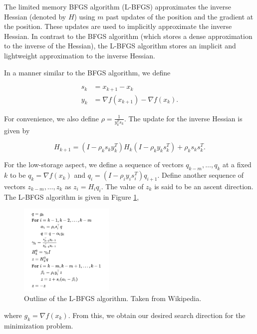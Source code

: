 
The limited memory BFGS algorithm (L-BFGS) approximates the inverse Hessian (denoted by $H$) using $m$ past updates of 
the position and the gradient at the position. These updates are used to implicitly approximate the inverse Hessian. In 
contrast to the BFGS algorithm (which stores a dense approximation to the inverse of the Hessian), the L-BFGS algorithm 
stores an implicit and lightweight approximation to the inverse Hessian.


In a manner similar to the BFGS algorithm, we define

\begin{align*}
    s_k &= x_{k+1} - x_k\\
    y_k &= \nabla f(x_{k+1}) - \nabla f(x_k).
\end{align*}

\noindent For convenience, we also define $\rho = \frac{1}{y_k^Ts_k}$. The update for the inverse Hessian is given by

$$
    H_{k+1} = (I - \rho_ks_ky_k^T)H_k(I - \rho_ky_ks_k^T) + \rho_ks_ks_k^T.
$$

For the low-storage aspect, we define a sequence of vectors $q_{k-m}, \dots, q_k$ at a fixed $k$ to be 
$q_k = \nabla f(x_k)$ and $q_i = (I - \rho_iy_is_i^T)q_{i+1}$. Define another sequence of vectors $z_{k-m},\dots, z_k$ 
as $z_i = H_iq_i$. The value of $z_k$ is said to be an ascent direction. The L-BFGS algorithm is given in Figure 
\ref{fig:L-BFGS-Algorithm},

\begin{figure}[h]
    \centering
    \includegraphics[width=0.40\textwidth]{images/L-BFGS-Algorithm.png}
    \caption{Outline of the L-BFGS algorithm. Taken from Wikipedia.}
    \label{fig:L-BFGS-Algorithm}
\end{figure}

\noindent where $g_k = \nabla f(x_k)$. From this, we obtain our desired search direction for the minimization problem.
